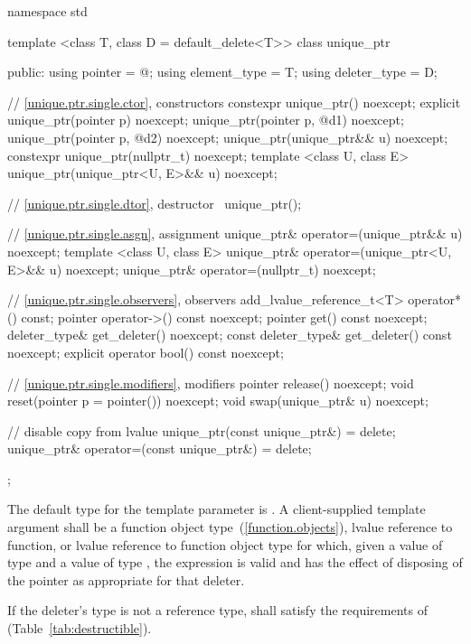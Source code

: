 %
\begin{codeblock}
namespace std {
  template <class T, class D = default_delete<T>> class unique_ptr {
  public:
    using pointer      = @\seebelow@;
    using element_type = T;
    using deleter_type = D;

    // \ref{unique.ptr.single.ctor}, constructors
    constexpr unique_ptr() noexcept;
    explicit unique_ptr(pointer p) noexcept;
    unique_ptr(pointer p, @\seebelow@ d1) noexcept;
    unique_ptr(pointer p, @\seebelow@ d2) noexcept;
    unique_ptr(unique_ptr&& u) noexcept;
    constexpr unique_ptr(nullptr_t) noexcept;
    template <class U, class E>
      unique_ptr(unique_ptr<U, E>&& u) noexcept;

    // \ref{unique.ptr.single.dtor}, destructor
    ~unique_ptr();

    // \ref{unique.ptr.single.asgn}, assignment
    unique_ptr& operator=(unique_ptr&& u) noexcept;
    template <class U, class E> unique_ptr& operator=(unique_ptr<U, E>&& u) noexcept;
    unique_ptr& operator=(nullptr_t) noexcept;

    // \ref{unique.ptr.single.observers}, observers
    add_lvalue_reference_t<T> operator*() const;
    pointer operator->() const noexcept;
    pointer get() const noexcept;
    deleter_type& get_deleter() noexcept;
    const deleter_type& get_deleter() const noexcept;
    explicit operator bool() const noexcept;

    // \ref{unique.ptr.single.modifiers}, modifiers
    pointer release() noexcept;
    void reset(pointer p = pointer()) noexcept;
    void swap(unique_ptr& u) noexcept;

    // disable copy from lvalue
    unique_ptr(const unique_ptr&) = delete;
    unique_ptr& operator=(const unique_ptr&) = delete;
  };
}
\end{codeblock}

\pnum
The default type for the template parameter  is
. A client-supplied template argument
 shall be a function
object type~(\ref{function.objects}), lvalue reference to function, or
lvalue reference to function object type
for which, given
a value  of type  and a value
 of type , the expression
 is valid and has the effect of disposing of the
pointer as appropriate for that deleter.

\pnum
If the deleter's type  is not a reference type,  shall satisfy
the requirements of  (Table~\ref{tab:destructible}).

